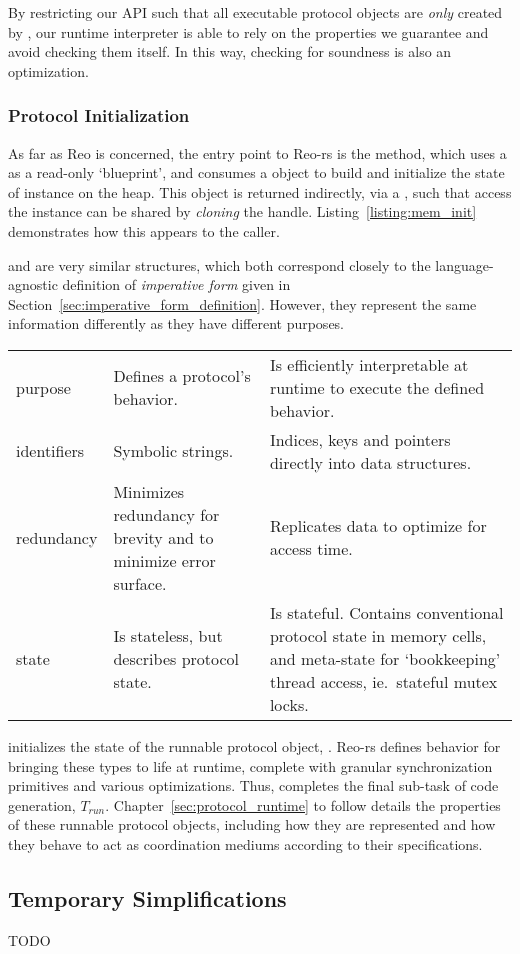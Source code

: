By restricting our API such that all executable protocol objects are \textit{only} created by , our runtime interpreter is able to rely on the properties we guarantee and avoid checking them itself. In this way, checking for soundness is also an optimization.


\subsubsection{Protocol Initialization}
As far as Reo is concerned, the entry point to Reo-rs is the  method, which uses a  as a read-only `blueprint', and consumes a  object to build and initialize the state of  instance on the heap. This object is returned indirectly, via a , such that access the  instance can be shared by \textit{cloning} the handle. Listing~\ref{listing:mem_init} demonstrates how this appears to the caller.

 and  are very similar structures, which both correspond closely to the language-agnostic definition of \textit{imperative form} given in Section~\ref{sec:imperative_form_definition}. However, they represent the same information differently as they have different purposes.

\noindent{}
\begin{footnotesize}
	\begin{tabular}{l|p{50mm}p{60mm}}
		& \code{ProtoDef}  & \code{Proto} \\
		\hline
		purpose & Defines a protocol's behavior. & Is efficiently interpretable at runtime to execute the defined behavior. \\
		identifiers & Symbolic strings. & Indices, keys and pointers directly into data structures. \\
		redundancy & Minimizes redundancy for brevity and to minimize error surface. & Replicates data to optimize for access time. \\
		state & Is stateless, but describes protocol state. & Is stateful. Contains conventional protocol state in memory cells, and meta-state for `bookkeeping' thread access, ie.\ stateful mutex locks.
	\end{tabular}
\end{footnotesize}
\vspace{1em}

 initializes the state of the runnable protocol object, . Reo-rs defines behavior for bringing these types to life at runtime, complete with granular synchronization primitives and various optimizations. Thus,  completes the final sub-task of code generation, $T_{run}$. Chapter~\ref{sec:protocol_runtime} to follow details the properties of these runnable protocol objects, including how they are represented and how they behave to act as coordination mediums according to their  specifications.


\subsection{Temporary Simplifications}
TODO